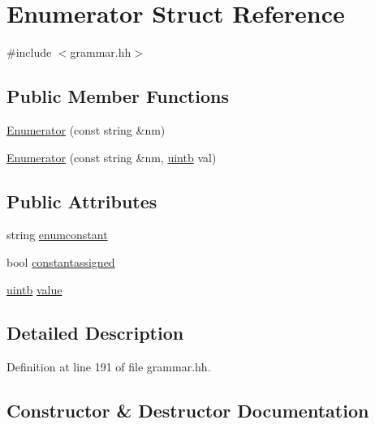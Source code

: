 \hypertarget{struct_enumerator}{}\section{Enumerator Struct Reference}
\label{struct_enumerator}


{\ttfamily \#include $<$grammar.\+hh$>$}

\subsection*{Public Member Functions}
\begin{DoxyCompactItemize}
\item 
\mbox{\hyperlink{struct_enumerator_ad25f52dcf278ff5b25d9942037fc9a6f}{Enumerator}} (const string \&nm)
\item 
\mbox{\hyperlink{struct_enumerator_ae8b2e7da98de20271313f23fe8b43699}{Enumerator}} (const string \&nm, \mbox{\hyperlink{types_8h_a2db313c5d32a12b01d26ac9b3bca178f}{uintb}} val)
\end{DoxyCompactItemize}
\subsection*{Public Attributes}
\begin{DoxyCompactItemize}
\item 
string \mbox{\hyperlink{struct_enumerator_a184991db56a2b8f47f9e6967e3005c23}{enumconstant}}
\item 
bool \mbox{\hyperlink{struct_enumerator_a913be77691c3f67be0eca6418fe04208}{constantassigned}}
\item 
\mbox{\hyperlink{types_8h_a2db313c5d32a12b01d26ac9b3bca178f}{uintb}} \mbox{\hyperlink{struct_enumerator_a7a5f9e3d9be753ba75cf267ac3e73930}{value}}
\end{DoxyCompactItemize}


\subsection{Detailed Description}


Definition at line 191 of file grammar.\+hh.



\subsection{Constructor \& Destructor Documentation}
\mbox{\label{struct_enumerator_ad25f52dcf278ff5b25d9942037fc9a6f}} 
